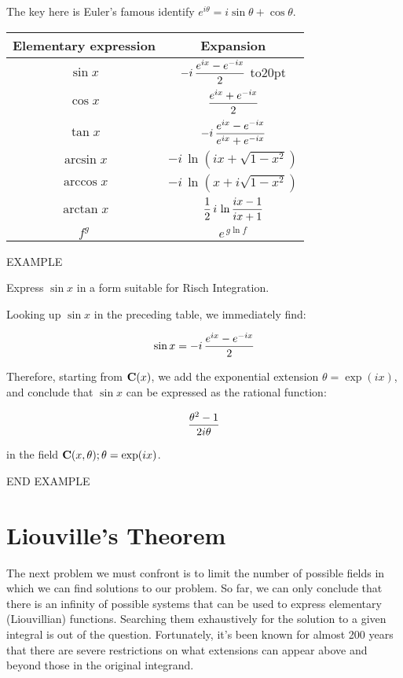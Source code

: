 The key here is Euler's famous identify $e^{i\theta}=i\sin\theta+\cos\theta$.

\begin{center}
\begin{tabular}{c c @{\bigskip}}
Elementary expression & \multicolumn{1}{c}{Expansion} \\
\hline
$\sin x$ & $\displaystyle {-i \,{{e^{ix} - e^{-ix}}\over 2}}$ \vbox to20pt{}\\
$\cos x$ & $\displaystyle {{e^{ix} + e^{-ix}}\over 2}$ \\
$\tan x$ & $\displaystyle {-i \,{{e^{ix}-e^{-ix}}\over {e^{ix}+e^{-ix}}}}$ \\
$\arcsin x$ & $\displaystyle -i \,\ln (ix + \sqrt{1-x^2})$ \\
$\arccos x$ & $\displaystyle -i \,\ln (x + i\sqrt{1-x^2})$ \\
$\arctan x$ & $\displaystyle {1\over2}\,i\,\ln {{ix-1}\over{ix+1}}$ \\
$f^g$ & $\displaystyle e^{\,g \ln f}$ \\
\end{tabular}
\end{center}

\vfill\eject

EXAMPLE

Express $\sin x$ in a form suitable for Risch Integration.

Looking up $\sin x$ in the preceding table, we immediately find:

$$\sin x = {-i \,{{e^{ix} - e^{-ix}}\over 2}}$$

Therefore, starting from ${\bf C}(x)$,
we add the exponential extension $\theta = \exp(ix)$,
and conclude that $\sin x$ can be expressed as the rational function:

$${{\theta^2 - 1}\over 2i\theta}$$

in the field ${\bf C}(x,\theta); \theta=\exp(ix)$.

END EXAMPLE

\vfill\eject

\section{Liouville's Theorem}

The next problem we must confront is to limit the number of possible
fields in which we can find solutions to our problem.  So far, we can
only conclude that there is an infinity of possible systems that can
be used to express elementary (Liouvillian) functions.  Searching them
exhaustively for the solution to a given integral is out of the
question.  Fortunately, it's been known for almost 200 years that
there are severe restrictions on what extensions can appear above and
beyond those in the original integrand.

